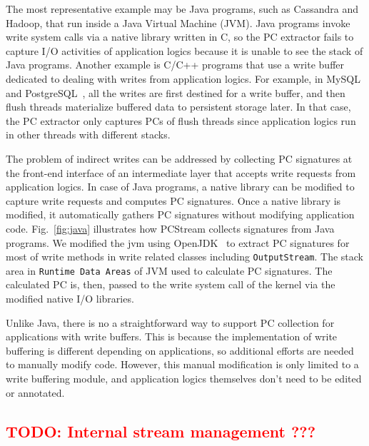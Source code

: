 The most representative example may be Java programs, such as Cassandra and
Hadoop, that run inside a Java Virtual Machine (JVM). Java programs invoke
write system calls via a native library written in C, so the PC extractor fails
to capture I/O activities of application logics because it is unable to see the
stack of Java programs.  Another example is C/C++ programs that use a write
buffer dedicated to dealing with writes from application logics. For example,
in MySQL~\cite{MySQL} and PostgreSQL~\cite{PostgreSQL}, all the writes are first
destined for a write buffer, and then flush threads materialize buffered data
to persistent storage later.  In that case, the PC extractor only captures PCs
of flush threads since application logics run in other threads with different
stacks.

The problem of indirect writes can be addressed by collecting PC signatures at
the front-end interface of an intermediate layer that accepts write requests
from application logics. In case of Java programs, a native library can be
modified to capture write requests and computes PC signatures. Once a native
library is modified, it automatically gathers PC signatures without modifying
application code. Fig.~\ref{fig:java} illustrates how \textsf{PCStream}
collects signatures from Java programs.  
We modified the jvm using OpenJDK~\cite{OpenJDK} to extract PC signatures for 
most of write methods in write related classes including \texttt{OutputStream}.
The stack area in \texttt{Runtime Data Areas} of JVM used to calculate PC signatures.
The calculated PC is, then, passed to the write system call of the kernel via
the modified native I/O libraries.

Unlike Java, there is no a straightforward way to support PC collection for
applications with write buffers. This is because the implementation of write
buffering is different depending on applications, so additional efforts are
needed to manually modify code. However, this manual modification is only
limited to a write buffering module, and application logics themselves don't
need to be edited or annotated.



\subsection{\textcolor{red}{TODO: Internal stream management ???}}




